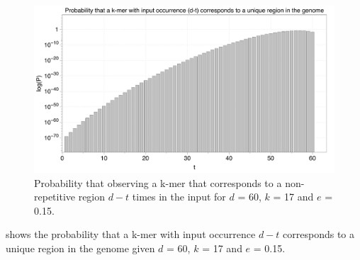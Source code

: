 \documentclass[11pt]{article}
\begin{document}
\begin{figure}
    \centering
    \includegraphics[width=\textwidth]{image/pdt.pdf}
    \caption{Probability that observing a k-mer that corresponds to a non-repetitive region $d-t$ times in the input for
    $d$ = 60, $k$ = 17 and $e$ = 0.15.}
    \label{fig:pdt}
\end{figure}
 shows the probability that a k-mer with input occurrence $d-t$ corresponds to a unique region in the genome given $d$ = 60, $k$ = 17 and $e$ = 0.15.
%
\end{document}
